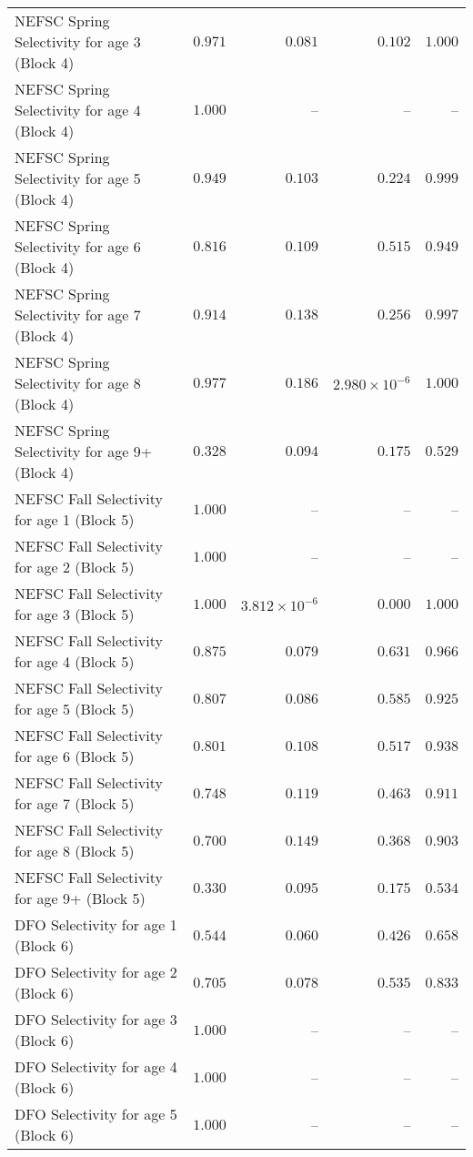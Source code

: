\documentclass[
]{article}
\begin{document}
\begin{landscape}
\begin{longtable}[t]{lrrrr}
NEFSC Spring Selectivity for age 3 (Block 4) & $0.971$ & $0.081$ & $0.102$ & $1.000$\\
NEFSC Spring Selectivity for age 4 (Block 4) & $1.000$ & -- & -- & --\\
NEFSC Spring Selectivity for age 5 (Block 4) & $0.949$ & $0.103$ & $0.224$ & $0.999$\\
NEFSC Spring Selectivity for age 6 (Block 4) & $0.816$ & $0.109$ & $0.515$ & $0.949$\\
\addlinespace
NEFSC Spring Selectivity for age 7 (Block 4) & $0.914$ & $0.138$ & $0.256$ & $0.997$\\
NEFSC Spring Selectivity for age 8 (Block 4) & $0.977$ & $0.186$ & $2.980\times 10^{-6}$ & $1.000$\\
NEFSC Spring Selectivity for age 9+ (Block 4) & $0.328$ & $0.094$ & $0.175$ & $0.529$\\
NEFSC Fall Selectivity for age 1 (Block 5) & $1.000$ & -- & -- & --\\
NEFSC Fall Selectivity for age 2 (Block 5) & $1.000$ & -- & -- & --\\
\addlinespace
NEFSC Fall Selectivity for age 3 (Block 5) & $1.000$ & $3.812\times 10^{-6}$ & $0.000$ & $1.000$\\
NEFSC Fall Selectivity for age 4 (Block 5) & $0.875$ & $0.079$ & $0.631$ & $0.966$\\
NEFSC Fall Selectivity for age 5 (Block 5) & $0.807$ & $0.086$ & $0.585$ & $0.925$\\
NEFSC Fall Selectivity for age 6 (Block 5) & $0.801$ & $0.108$ & $0.517$ & $0.938$\\
NEFSC Fall Selectivity for age 7 (Block 5) & $0.748$ & $0.119$ & $0.463$ & $0.911$\\
\addlinespace
NEFSC Fall Selectivity for age 8 (Block 5) & $0.700$ & $0.149$ & $0.368$ & $0.903$\\
NEFSC Fall Selectivity for age 9+ (Block 5) & $0.330$ & $0.095$ & $0.175$ & $0.534$\\
DFO Selectivity for age 1 (Block 6) & $0.544$ & $0.060$ & $0.426$ & $0.658$\\
DFO Selectivity for age 2 (Block 6) & $0.705$ & $0.078$ & $0.535$ & $0.833$\\
DFO Selectivity for age 3 (Block 6) & $1.000$ & -- & -- & --\\
\addlinespace
DFO Selectivity for age 4 (Block 6) & $1.000$ & -- & -- & --\\
DFO Selectivity for age 5 (Block 6) & $1.000$ & -- & -- & --\\

\end{longtable}
\end{landscape}
\end{document}
